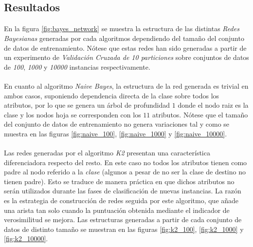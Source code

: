 \documentclass{article}
\begin{document}
		\subsection{Resultados}
		\label{sec:results}

			\paragraph{}
			En la figura \ref{fig:bayes_network} se muestra la estructura de las distintas \emph{Redes Bayesianas} generadas por cada algoritmos dependiendo del tamaño del conjunto de datos de entrenamiento. Nótese que estas redes han sido generadas a partir de un experimento de \emph{Validación Cruzada de 10 particiones} sobre conjuntos de datos de \emph{100}, \emph{1000} y \emph{10000} instancias respectivamente.

			\paragraph{}
			En cuanto al algoritmo \emph{Naive Bayes}, la estructura de la red generada es trivial en ambos casos, suponiendo dependencia directa de la clase sobre todos los atributos, por lo que se genera un árbol de profundidad $1$ donde el nodo raiz es la clase y los nodos hoja se corresponden con los $11$ atributos. Nótese que el tamaño del conjunto de datos de entrenamiento no genera variaciones tal y como se muestra en las figuras \ref{fig:naive_100}, \ref{fig:naive_1000} y \ref{fig:naive_10000}.

			\paragraph{}
			Las redes generadas por el algoritmo \emph{K2} presentan una característica diferenciadora respecto del resto. En este caso no todos los atributos tienen como padre al nodo referido a la \emph{clase} (algunos a pesar de no ser la clase de destino no tienen padre). Esto se traduce de manera práctica en que dichos atributos no serán utilizados durante las fases de clasificación de nuevas instancias. La razón es la estrategia de construcción de redes seguida por este algoritmo, que añade una arista tan solo cuando la puntuación obtenida mediante el indicador de verosimilitud se mejora. Las estructuras generadas a partir de cada conjunto de datos de distinto tamaño se muestran en las figuras \ref{fig:k2_100}, \ref{fig:k2_1000} y \ref{fig:k2_10000}.
\end{document}
